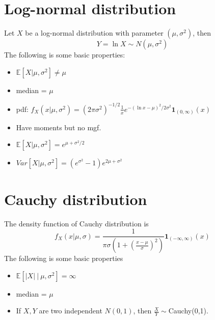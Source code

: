 \documentclass[../Distributions.tex]{subfiles}
\begin{document}
\section{Log-normal distribution}
Let $X$ be a log-normal distribution with parameter $(\mu,\sigma^2)$, then
$$Y = \ln X \sim N(\mu,\sigma^2)$$
The following is some basic properties:
\begin{itemize}
	\item $\mathbb{E}[X|\mu,\sigma^2] \neq\mu$
	\item median = $\mu$
	\item pdf: $f_X(x|\mu,\sigma^2) = (2\pi\sigma^2)^{-1/2}\frac{1}{x}e^{-(\ln x-\mu)^2/2\sigma^2}\mathbf{1}_{(0,\infty)}(x)$
	\item Have moments but no mgf.
	\item $\mathbb{E}[X|\mu,\sigma^2] = e^{\mu+\sigma^2/2}$
	\item $Var[X|\mu,\sigma^2] = (e^{\sigma^2}-1)e^{2\mu+\sigma^2}$
\end{itemize}

\section{Cauchy distribution}
The density function of Cauchy distribution is
$$f_X(x|\mu,\sigma) = \frac{1}{\pi\sigma(1+(\frac{x-\mu}{\sigma})^2)}\mathbf{1}_{(-\infty,\infty)}(x)$$
The following is some basic properties
\begin{itemize}
	\item $\mathbb{E}[|X|\ |\ \mu,\sigma^2] = \infty$
	\item median = $\mu$
	\item If $X,Y$ are two independent $N(0,1)$, then $\frac{X}{Y}\sim$Cauchy(0,1).
\end{itemize}
\end{document}

